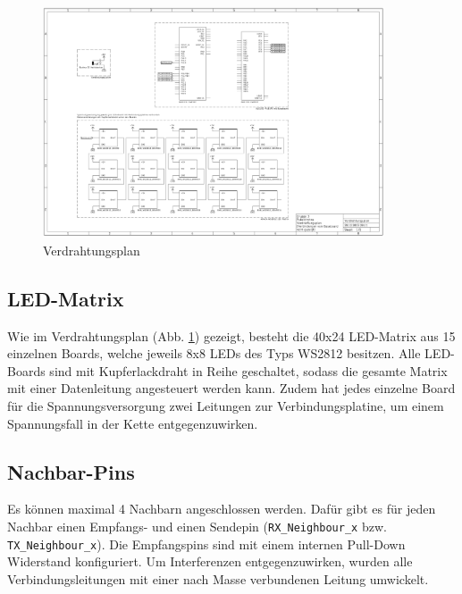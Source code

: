 \begin{figure}[H]
    \centering
    \includegraphics[angle=90,page=1,width=0.9\textwidth]{pdfs/Verdrahtungsplan.pdf} %
    \caption{Verdrahtungsplan}
    \label{fig:Verdrahtungsplan}
\end{figure}

\subsection{LED-Matrix}
Wie im Verdrahtungsplan (Abb. \ref{fig:Verdrahtungsplan}) gezeigt, besteht die 40x24 LED-Matrix aus 15 einzelnen Boards, welche jeweils 8x8 LEDs des Typs WS2812 besitzen. Alle LED-Boards sind mit Kupferlackdraht in Reihe geschaltet, sodass die gesamte Matrix mit einer Datenleitung angesteuert werden kann. Zudem hat jedes einzelne Board für die Spannungsversorgung zwei Leitungen zur Verbindungsplatine, um einem Spannungsfall in der Kette entgegenzuwirken.
\subsection{Nachbar-Pins}
Es können maximal 4 Nachbarn angeschlossen werden. Dafür gibt es für jeden Nachbar einen Empfangs- und einen Sendepin (\texttt{RX\_Neighbour\_x} bzw. \texttt{TX\_Neighbour\_x}). Die Empfangspins sind mit einem internen Pull-Down Widerstand konfiguriert. Um Interferenzen entgegenzuwirken, wurden alle Verbindungsleitungen mit einer nach Masse verbundenen Leitung umwickelt.
